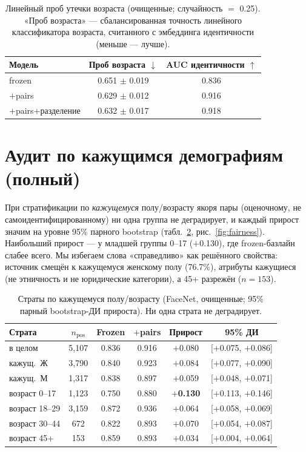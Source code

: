 \documentclass[10pt,twocolumn,letterpaper]{article}
\begin{document}
\begin{table}[t]
\centering
\small
\setlength{\tabcolsep}{4pt}
\begin{tabular}{@{}lcc@{}}
\toprule
Модель & Проб возраста $\downarrow$ & AUC идентичности $\uparrow$ \\
\midrule
frozen & 0.651 $\pm$ 0.019 & 0.836 \\
$+$pairs & 0.629 $\pm$ 0.012 & 0.916 \\
$+$pairs$+$разделение & 0.632 $\pm$ 0.017 & 0.918 \\
\bottomrule
\end{tabular}
\caption{Линейный проб утечки возраста (очищенные; случайность $=$ 0.25). «Проб возраста» — сбалансированная
точность линейного классификатора возраста, считанного с эмбеддинга идентичности (меньше — лучше).}
\label{tab:leakage}
\end{table}

\section{Аудит по кажущимся демографиям (полный)}\label{sup:fairness}
При стратификации по \emph{кажущемуся} полу/возрасту якоря пары (оценочному, не самоидентифицированному)
ни одна группа не деградирует, и каждый прирост значим на уровне 95\% парного bootstrap
(табл.~\ref{tab:strata}, рис.~\ref{fig:fairness}). Наибольший прирост — у младшей группы 0--17
($+$0.130), где frozen-базлайн слабее всего. Мы избегаем слова «справедливо» как решённого свойства:
источник смещён к кажущемуся женскому полу (76.7\%), атрибуты кажущиеся (не этничность и не юридические
категории), а 45+ разрежён ($n{=}153$).

\begin{table}[t]
\centering
\small
\begin{tabular}{@{}lccccc@{}}
\toprule
Страта & $n_{\text{pos}}$ & Frozen & $+$pairs & Прирост & 95\% ДИ \\
\midrule
в целом & 5{,}107 & 0.836 & 0.916 & $+$0.080 & [$+$0.075, $+$0.086] \\
кажущ.\ Ж & 3{,}790 & 0.840 & 0.923 & $+$0.084 & [$+$0.077, $+$0.090] \\
кажущ.\ М & 1{,}317 & 0.838 & 0.897 & $+$0.059 & [$+$0.048, $+$0.071] \\
возраст 0--17 & 1{,}123 & 0.750 & 0.880 & \textbf{$+$0.130} & [$+$0.113, $+$0.146] \\
возраст 18--29 & 3{,}159 & 0.872 & 0.936 & $+$0.064 & [$+$0.058, $+$0.069] \\
возраст 30--44 & 672 & 0.822 & 0.893 & $+$0.070 & [$+$0.054, $+$0.087] \\
возраст 45+ & 153 & 0.859 & 0.893 & $+$0.034 & [$+$0.004, $+$0.064] \\
\bottomrule
\end{tabular}
\caption{Страты по кажущемуся полу/возрасту (FaceNet, очищенные; 95\% парный bootstrap-ДИ прироста). Ни
одна страта не деградирует.}
\label{tab:strata}
\end{table}
\end{document}

